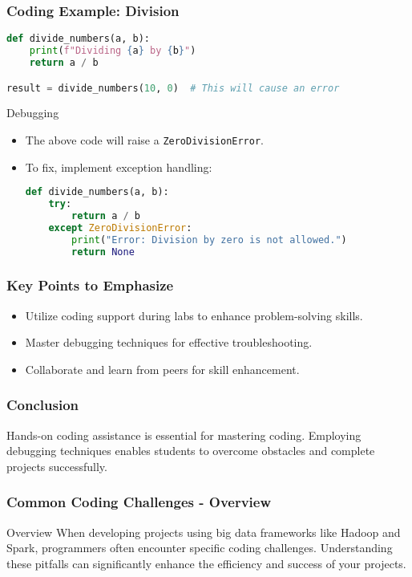 \documentclass[aspectratio=169]{beamer}
\begin{document}
\begin{frame}[fragile]
  \frametitle{Coding Example: Division}
  \begin{lstlisting}[language=python]
def divide_numbers(a, b):
    print(f"Dividing {a} by {b}")
    return a / b

result = divide_numbers(10, 0)  # This will cause an error
  \end{lstlisting}
  
  \begin{block}{Debugging}
    \begin{itemize}
      \item The above code will raise a \texttt{ZeroDivisionError}.
      \item To fix, implement exception handling:
      \begin{lstlisting}[language=python]
def divide_numbers(a, b):
    try:
        return a / b
    except ZeroDivisionError:
        print("Error: Division by zero is not allowed.")
        return None
      \end{lstlisting}
    \end{itemize}
  \end{block}
\end{frame}

\begin{frame}[fragile]
  \frametitle{Key Points to Emphasize}
  \begin{itemize}
    \item Utilize coding support during labs to enhance problem-solving skills.
    \item Master debugging techniques for effective troubleshooting.
    \item Collaborate and learn from peers for skill enhancement.
  \end{itemize}
\end{frame}

\begin{frame}[fragile]
  \frametitle{Conclusion}
  Hands-on coding assistance is essential for mastering coding. Employing debugging techniques enables students to overcome obstacles and complete projects successfully.
\end{frame}

\begin{frame}[fragile]
    \frametitle{Common Coding Challenges - Overview}
    \begin{block}{Overview}
        When developing projects using big data frameworks like Hadoop and Spark, programmers often encounter specific coding challenges. Understanding these pitfalls can significantly enhance the efficiency and success of your projects.
    \end{block}
\end{frame}
\end{document}
